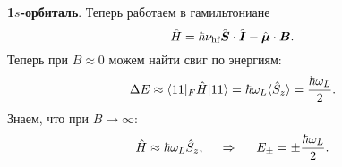 \textbf{1$s$-орбиталь}. Теперь работаем в гамильтониане
\begin{equation*}
    \hat{H} = \hbar \nu_{\textnormal{hf}} \hat{\mbox{\boldmath $S$}} \cdot \hat{\mbox{\boldmath $I$}} - \hat{\mbox{\boldmath $\mu$}} \cdot  \mbox{\boldmath $B$}.
\end{equation*}
Теперь при $B \approx 0$ можем найти свиг по энергиям:
\begin{equation*}
    \Delta E \approx \bk{11}[{}_F \hat{H}]{11} = \hbar \omega_L \langle \hat{S}_z\rangle = \frac{\hbar \omega_L}{2}.
\end{equation*}
Знаем, что при $B \to \infty$:
\begin{equation*}
    \hat{H} \approx \hbar \omega_L \hat{S}_z, 
    \hspace{0.5cm} \Rightarrow \hspace{0.5cm}
    E_\pm = \pm \frac{\hbar \omega_L}{2}.
\end{equation*}





